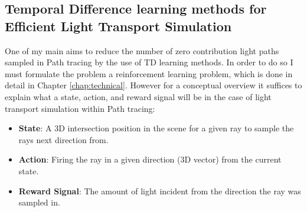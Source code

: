 \documentclass[../dissertation.tex]{subfiles}
\begin{document}

\subsection{Temporal Difference learning methods for Efficient Light Transport Simulation}

One of my main aims to reduce the number of zero contribution light paths sampled 
in Path tracing by the use of TD learning methods. In order to do so I must formulate 
the problem a reinforcement learning problem, which is done in detail in Chapter
\ref{chap:technical}. However for a conceptual overview it suffices to explain what a 
state, action, and reward signal will be in the case of light transport simulation within 
Path tracing:

\begin{itemize}

\item \textbf{State}: A 3D intersection position in the scene for a given ray to sample 
the rays next direction from. 

\item \textbf{Action}: Firing the ray in a given direction (3D vector) from the current 
state.

\item \textbf{Reward Signal}: The amount of light incident from the direction the ray 
was sampled in.

\end{itemize}
\end{document}
